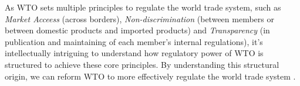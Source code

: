 As WTO sets multiple principles to regulate the world trade system, 
such as \textit{Market Acceess} (across borders), 
\textit{Non-discrimination} (between members 
or between domestic products and imported products) 
and \textit{Transparency} (in publication and maintaining 
of each member's internal regulations), 
it's intellectually intriguing 
to understand how regulatory power of WTO
is structured to achieve these core principles.
By understanding this structural origin, 
we can reform WTO to more effectively regulate 
the world trade system 
\citep{FREDEBEULKREIN1999625, shaffer_2004, 10.1093/jiel/jgm028}.



